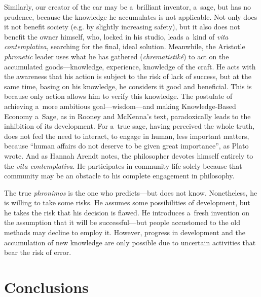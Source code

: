 Similarly, our creator of the car may be a~brilliant inventor, a~sage, but has no prudence, because the knowledge he accumulates is not applicable. Not only does it not benefit society (e.g. by slightly increasing safety), but it also does not benefit the owner himself, who, locked in his studio, leads a~kind of \textit{vita} \textit{contemplativa}, searching for the final, ideal solution. Meanwhile, the Aristotle \textit{phronetic} leader uses what he has gathered (\textit{chrematistiké}) to act on the accumulated goods---knowledge, experience, knowledge of the craft. He acts with the awareness that his action is subject to the risk of lack of success, but at the same time, basing on his knowledge, he considers it good and beneficial. This is because only action allows him to verify this knowledge. The postulate of achieving a~more ambitious goal---wisdom---and making Knowledge-Based Economy a~Sage, as in Rooney and McKenna's text, paradoxically leads to the inhibition of its development. For a~true sage, having perceived the whole truth, does not feel the need to interact, to engage in human, less important matters, because ``human affairs do not deserve to be given great importance'', as Plato 
\parencite[][]{} %
 wrote. And as Hannah Arendt 
\parencite*[][p.32]{arendt_promise_2005} %
 notes, the philosopher devotes himself entirely to the \textit{vita contemplativa}. He participates in community life solely because that community may be an obstacle to his complete engagement in philosophy.



The true \textit{phronimos} is the one who predicts---but does not know. Nonetheless, he is willing to take some risks. He assumes some possibilities of development, but he takes the risk that his decision is flawed. He introduces a~fresh invention on the assumption that it will be successful---but people accustomed to the old methods may decline to employ it. However, progress in development and the accumulation of new knowledge are only possible due to uncertain activities that bear the risk of error.



\section{Conclusions}


